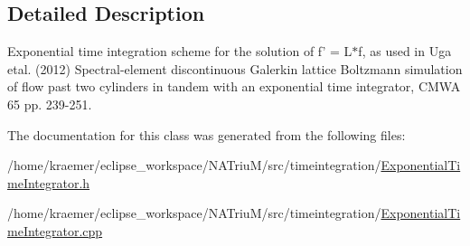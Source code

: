 \subsection{\-Detailed \-Description}
\-Exponential time integration scheme for the solution of f' = \-L$\ast$f, as used in \-Uga etal. (2012) \-Spectral-\/element discontinuous \-Galerkin lattice \-Boltzmann simulation of flow past two cylinders in tandem with an exponential time integrator, \-C\-M\-W\-A 65 pp. 239-\/251. 

\-The documentation for this class was generated from the following files\-:\begin{DoxyCompactItemize}
\item 
/home/kraemer/eclipse\-\_\-workspace/\-N\-A\-Triu\-M/src/timeintegration/\hyperlink{ExponentialTimeIntegrator_8h}{\-Exponential\-Time\-Integrator.\-h}\item 
/home/kraemer/eclipse\-\_\-workspace/\-N\-A\-Triu\-M/src/timeintegration/\hyperlink{ExponentialTimeIntegrator_8cpp}{\-Exponential\-Time\-Integrator.\-cpp}\end{DoxyCompactItemize}

